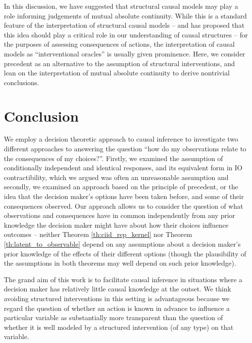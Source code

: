 In this discussion, we have suggested that structural causal models may play a role informing judgements of mutual absolute continuity. While this is a standard feature of the interpretation of structural causal models -- and \citet{lemeire_replacing_2013} has proposed that this idea should play a critical role in our understanding of causal structures -- for the purposes of assessing consequences of actions, the interpretation of causal models as ``interventional oracles'' \citep[Section 1.3.1]{pearl_causality:_2009} is usually given prominence. Here, we consider precedent as an alternative to the assumption of structural interventions, and lean on the interpretation of mutual absolute continuity to derive nontrivial conclusions.

\section{Conclusion}

We employ a decision theoretic approach to causal inference to investigate two different approaches to answering the question ``how do my observations relate to the consequences of my choices?''. Firstly, we examined the assumption of conditionally independent and identical responses, and its equivalent form in IO contractibility, which we argued was often an unreasonable assumption and secondly, we examined an approach based on the principle of precedent, or the idea that the decision maker's options have been taken before, and some of their consequences observed. Our approach allows us to consider the question of what observations and consequences have in common independently from any prior knowledge the decision maker might have about how their choices influence outcomes -- neither Theorem \ref{th:ciid_rep_kernel} nor Theorem \ref{th:latent_to_observable} depend on any assumptions about a decision maker's prior knowledge of the effects of their different options (though the plausibility of the assumptions in both theorems may well depend on such prior knowledge).

The grand aim of this work is to facilitate causal inference in situations where a decision maker has relatively little causal knowledge at the outset. We think avoiding structured interventions in this setting is advantageous because we regard the question of whether an action is known in advance to influence a particular variable as substantially more transparent than the question of whether it is well modeled by a structured intervention (of any type) on that variable.

